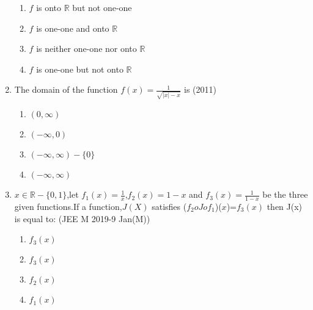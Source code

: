 \documentclass[journal,12pt,twocolumn]{IEEEtran}
\theoremstyle{remark}
\begin{document}
\begin{enumerate}[start=4]
	     \begin{enumerate}
		     \item $f$ is onto $\mathbb{R}$ but not one-one
		     \item $f$ is one-one and onto $\mathbb{R}$
		     \item $f$ is neither one-one nor onto $\mathbb{R}$
		     \item $f$ is one-one but not onto $\mathbb{R}$
	     \end{enumerate}
     \item The domain of the function $f(x)=\frac{1}{\sqrt{|x|-x}}$ is \hfill(2011)\\
	     \begin{enumerate}
		     \item $(0,\infty)$
		     \item $(-\infty,0)$
		     \item $(-\infty,\infty)-\{0\} $
		     \item $(-\infty,\infty)$
	     \end{enumerate}

     \item $x\in \mathbb{R}-\{0,1\}$,let $f_1(x)=\frac{1}{x}$,$f_2(x)=1-x$ and $f_3(x)=\frac{1}{1-x}$ be the three given functions.If a function,$J(X)$ satisfies ($f_2oJof_1$)($x$)=$f_3(x)$ then J(x) is equal to: \hfill(JEE M 2019-9 Jan(M))
	     \begin{enumerate}
		     \item $f_3(x)$
		     \item $f_3(x)$
		     \item $f_2(x)$
		     \item $f_1(x)$
	     \end{enumerate}
	
\end{enumerate}
\end{document}
